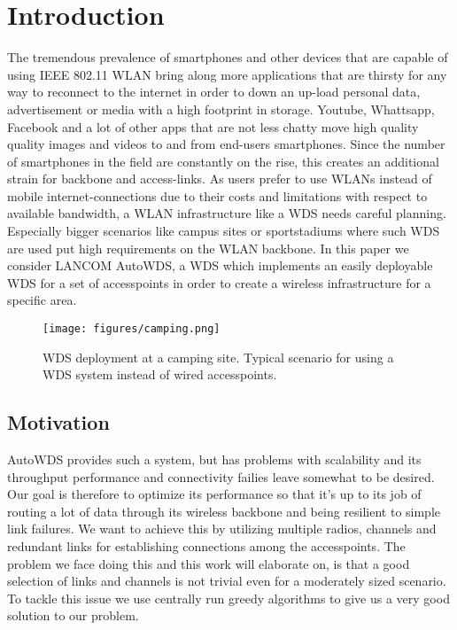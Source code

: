 \chapter{Introduction}
  The tremendous prevalence of smartphones and other devices that are capable of using IEEE 802.11 WLAN bring along 
  more applications that are thirsty for any way to reconnect to the internet in order to 
  down an up-load personal data, advertisement or media with a high footprint in storage.
  Youtube, Whattsapp, Facebook and a lot of other apps that are not less chatty move high quality quality images and videos 
  to and from end-users smartphones. Since the number of smartphones in the field are constantly on the rise, this creates an additional strain for
  backbone and access-links. As users prefer to use WLANs instead of mobile internet-connections due to their costs and limitations with respect to available bandwidth,
  a WLAN infrastructure like a WDS needs careful planning. Especially bigger scenarios like campus sites or sportstadiums where such WDS are used put high requirements on the
  WLAN backbone. In this paper we consider LANCOM AutoWDS, 
  a WDS which implements an easily deployable \ac{WDS} for a set of accesspoints in order to create a wireless infrastructure for a specific area.

  \begin{figure}[h]
    \centering
    \texttt{[image: figures/camping.png]}
    \caption{WDS deployment at a camping site. Typical scenario for using a WDS system instead of wired accesspoints.}
    \label{fig:camping}
  \end{figure}
  
\section{Motivation}
  AutoWDS provides such a system, but has problems with scalability and its throughput performance and connectivity failies leave somewhat to be desired.
  Our goal is therefore to optimize its performance so that it's up to its job of routing a lot of data through its wireless backbone and being resilient to simple link
  failures. We want to achieve this by utilizing multiple radios, channels and redundant links for establishing connections among the accesspoints.
  The problem we face doing this and this work will elaborate on, is that a good selection of links and channels is not trivial even for a moderately sized scenario.
  To tackle this issue we use centrally run greedy algorithms to give us a very good solution to our problem.
  
